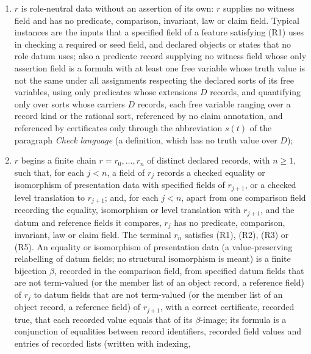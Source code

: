 \begin{definition}
\begin{enumerate}[label=(R\arabic*),topsep=2pt,itemsep=1pt]
    formula schema of a witness-schema annotation has field role datum or
    reference; a substantive assertion in a claim statement is represented by
    content records (Definition~\ref{def:annotations}), which are assessed
    under (R1)--(R5);
  \item \(r\) is role-neutral data without an assertion of its own: \(r\)
    supplies no witness field and has no predicate, comparison, invariant,
    law or claim field. Typical instances are the inputs that a specified field
    of a feature satisfying (R1) uses in checking a required or seed field, and
    declared objects or states that no role datum uses; also a predicate record supplying no witness field whose only assertion field is a formula with at least one free variable whose truth value is not the same under all assignments respecting the declared sorts of its free variables, using only predicates whose extensions \(D\) records, and quantifying only over sorts whose carriers \(D\) records, each free variable ranging over a record kind or the rational sort, referenced by no claim annotation, and referenced by certificates only through the abbreviation \(s(t)\) of the paragraph \emph{Check language} (a definition, which has no truth value over \(D\));
  \item \(r\) begins a finite chain \(r=r_0,\ldots,r_n\) of distinct
    declared records, with \(n\geq1\), such that, for each \(j<n\), a field of \(r_j\) records a checked
    equality or isomorphism of presentation data with specified fields of
    \(r_{j+1}\), or a checked level translation to \(r_{j+1}\); and, for each \(j<n\), apart from one comparison field recording the equality, isomorphism or level translation with \(r_{j+1}\), and the datum and reference fields it compares, \(r_j\) has no predicate, comparison, invariant, law or claim field. The terminal \(r_n\) satisfies (R1), (R2), (R3) or
    (R5). An equality or isomorphism of presentation data (a value-preserving
    relabelling of datum fields; no structural isomorphism is meant) is a finite
    bijection \(\beta\), recorded in the comparison field, from specified datum fields that are not term-valued
    (or the member list of an object record, a reference field) of \(r_j\) to datum fields that are not term-valued (or the member list of an object record, a reference field) of \(r_{j+1}\), with a
    correct certificate, recorded true, that each recorded value equals that of its \(\beta\)-image;
    its formula is a conjunction of equalities between record identifiers,
    recorded field values and entries of recorded lists (written with indexing,

\end{enumerate}
\end{definition}
